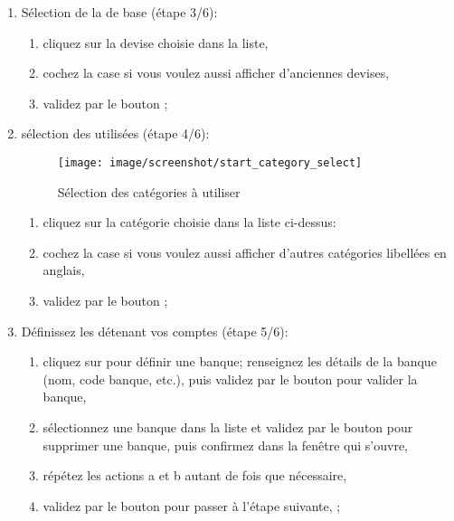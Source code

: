 \begin{enumerate}
	\item Sélection de la  de base (étape 3/6):
		\begin{enumerate} 
		 	\item cliquez sur la devise choisie dans la liste,
			\item cochez la case  si vous voulez aussi afficher d'anciennes devises,
			\item validez par le bouton ;
		\end{enumerate}

	\item sélection des  utilisées (étape 4/6):
	
	\begin{figure}[htbp]
	\begin{center}
		\texttt{[image: image/screenshot/start\_category\_select]}
	\end{center}
	\caption{Sélection des catégories à utiliser}
	\label{start_category_select}
	\end{figure}
		
		\begin{enumerate} 
		 	\item cliquez sur la catégorie choisie dans la liste ci-dessus:
			\item cochez la case  si vous voulez aussi afficher d'autres catégories libellées en anglais,
			\item validez par le bouton ;
		\end{enumerate}		

	\item Définissez les  détenant vos comptes (étape 5/6):
		\begin{enumerate} 
		 	\item cliquez sur   pour définir une banque; renseignez les détails de la banque (nom, code banque, etc.), puis validez par le bouton  pour valider la banque,
			\item sélectionnez une banque dans la liste et validez par le bouton  pour supprimer une banque, puis confirmez dans la fenêtre qui s'ouvre,
			\item répétez les actions a et b autant de fois que nécessaire,
			\item  validez par le bouton  pour passer à l'étape suivante, ;
		\end{enumerate}		 	


\end{enumerate}
